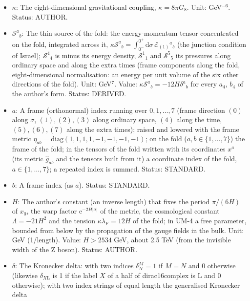 \documentclass[
  10pt,
]{article}
\providecommand{\tightlist}{%
  \setlength{\itemsep}{0pt}\setlength{\parskip}{0pt}}
\begin{document}
\begin{itemize}
\tightlist
\item
  \(\kappa\): The eight-dimensional gravitational coupling,
  \(\kappa = 8\pi G_8\). Unit: GeV\(^{-6}\). Status: AUTHOR.
\item
  \(\mathcal{S}^a{}_b\): The thin source of the fold: the
  energy-momentum tensor concentrated on the fold, integrated across it,
  \(\kappa\mathcal{S}^a{}_b = \int_{0^-}^{0^+}\mathrm{d}\sigma\,\mathcal{E}_{(1)}{}^a{}_b\)
  (the junction condition of Israel); \(\mathcal{S}^4{}_4\) is minus its
  energy density, \(\mathcal{S}^1{}_1\) and \(\mathcal{S}^5{}_5\) its
  pressures along ordinary space and along the extra times (frame
  components along the fold, eight-dimensional normalisation: an energy
  per unit volume of the six other directions of the fold). Unit:
  GeV\(^7\). Value: \(\kappa\mathcal{S}^a{}_b = -12H\delta^a{}_b\) for
  every \(a_4\), \(b_4\) of the author's form. Status: DERIVED.
\item
  \(a\): A frame (orthonormal) index running over \(0, 1, \dots, 7\)
  (frame direction \((0)\) along \(\sigma\), \((1), (2), (3)\) along
  ordinary space, \((4)\) along the time, \((5), (6), (7)\) along the
  extra times); raised and lowered with the frame metric
  \(\eta_{ab} = \mathrm{diag}(1, 1, 1, 1, -1, -1, -1, -1)\); on the fold
  (\(a, b \in \{1, \dots, 7\}\)) the frame of the fold; in the tensors
  of the fold written with its coordinates \(x^a\) (its metric
  \(\hat g_{ab}\) and the tensors built from it) a coordinate index of
  the fold, \(a \in \{1, \dots, 7\}\); a repeated index is summed.
  Status: STANDARD.
\item
  \(b\): A frame index (as \(a\)). Status: STANDARD.
\item
  \(H\): The author's constant (an inverse length) that fixes the period
  \(\pi/(6H)\) of \(x_0\), the warp factor
  \(\mathrm{e}^{-2H\lvert\sigma\rvert}\) of the metric, the cosmological
  constant \(\Lambda = -21H^2\) and the tension
  \(\kappa\lambda_{\mathrm{F}} = 12H\) of the fold; in UM-4 a free
  parameter, bounded from below by the propagation of the gauge fields
  in the bulk. Unit: GeV (1/length). Value: \(H > 2534\) GeV, about 2.5
  TeV (from the invisible width of the Z boson). Status: AUTHOR.
\item
  \(\delta\): The Kronecker delta: with two indices \(\delta^M_N = 1\)
  if \(M = N\) and 0 otherwise (likewise \(\delta_{X\mathrm{L}}\) is 1
  if the label \(X\) of a half of dirac16complex is L and 0 otherwise);
  with two index strings of equal length the generalised Kronecker delta

\end{itemize}
\end{document}
